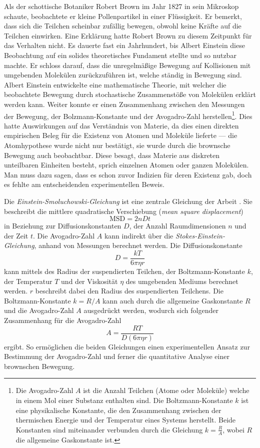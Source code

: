 Als der schottische Botaniker Robert Brown im Jahr 1827 in sein Mikroskop schaute, beobachtete er kleine Pollenpartikel in einer Flüssigkeit. Er bemerkt, dass sich die Teilchen scheinbar zufällig bewegen, obwohl keine Kräfte auf die Teilchen einwirken. Eine Erklärung hatte Robert Brown zu diesem Zeitpunkt für das Verhalten nicht. Es dauerte fast ein Jahrhundert, bis Albert Einstein diese Beobachtung auf ein solides theoretisches Fundament stellte und so nutzbar machte. Er schloss darauf, dass die unregelmäßige Bewegung auf Kollisionen mit umgebenden Molekülen zurückzuführen ist, welche ständig in Bewegung sind. Albert Einstein entwickelte eine mathematische Theorie, mit welcher die beobachtete Bewegung durch stochastische Zusammenstöße von Molekülen erklärt werden kann. Weiter konnte er einen Zusammenhang zwischen den Messungen der Bewegung, der Bolzmann-Konstante und der  Avogadro-Zahl herstellen\footnote{Die Avogadro-Zahl $ A $ ist die Anzahl Teilchen (Atome oder Moleküle) welche in einem Mol einer Substanz enthalten sind. Die Boltzmann-Konstante $ k $ ist eine physikalische Konstante, die den Zusammenhang zwischen der thermischen Energie und der Temperatur eines Systems herstellt. Beide Konstanten sind miteinander verbunden durch die Gleichung $ k = \frac{R}{A} $, wobei $ R $ die allgemeine Gaskonstante ist.}. Dies hatte Auswirkungen auf das Verständnis von Materie, da dies einen direkten empirischen Beleg für die Existenz von Atomen und Moleküle lieferte --- die Atomhypothese wurde nicht nur bestätigt, sie wurde durch die brownsche Bewegung auch beobachtbar. Diese besagt, dass Materie aus diskreten unteilbaren Einheiten besteht, sprich einzelnen Atomen oder ganzen Molekülen. Man muss dazu sagen, dass es schon zuvor Indizien für deren Existenz gab, doch es fehlte am entscheidenden experimentellen Beweis.


Die \textit{Einstein-Smoluchowski-Gleichung} ist eine zentrale Gleichung der Arbeit \cite{einstein1922untersuchungen}. Sie beschreibt die mittlere quadratische Verschiebung (\textit{mean square displacement})
\begin{equation}
	\mathrm{MSD} = 2nDt
\end{equation}
in Beziehung zur Diffusionskonstanten $ D $, der Anzahl Raumdimensionen $ n $ und der Zeit $ t $. Die Avogadro-Zahl $ A $ kann indirekt über die \textit{Stokes-Einstein-Gleichung}, anhand von Messungen berechnet werden. Die Diffusionskonstante
\begin{equation}
	D = \frac{kT}{6\pi\eta r}
\end{equation}
kann mittels des Radius der suspendierten Teilchen, der Boltzmann-Konstante  $ k $, der Temperatur $ T $ und der Viskosität $ \eta $ des umgebenden Mediums berechnet werden. $ r $ beschreibt dabei den Radius des suspendierten Teilchens. Die Boltzmann-Konstante  $ k = R/A $ kann auch durch die allgemeine Gaskonstante $ R $ und die Avogadro-Zahl $ A $ ausgedrückt werden, wodurch sich folgender Zusammenhang für die Avogadro-Zahl
\begin{equation}
	A = \frac{R T}{D (6 \pi \eta r)}
\end{equation}
ergibt. So ermöglichen die beiden Gleichungen einen experimentellen Ansatz zur Bestimmung der Avogadro-Zahl und ferner die quantitative Analyse einer brownschen Bewegung.


